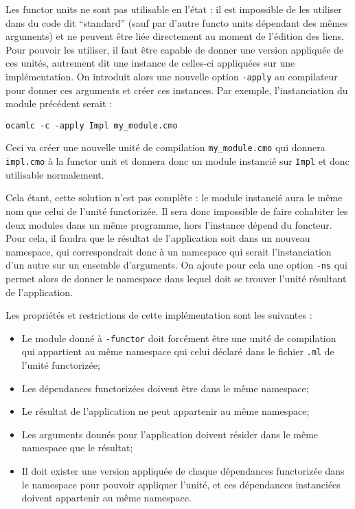 \documentclass[11pt,a4paper]{report}
\begin{document}
Les functor units ne sont pas utilisable en l'état : il est impossible de les
utiliser dans du code dit ``standard'' (sauf par d'autre functo units dépendant
des mêmes arguments) et ne peuvent être liée directement au
moment de l'édition des liens. Pour pouvoir les utiliser, il faut être capable
de donner une version appliquée de ces unités, autrement dit une instance de
celles-ci appliquées sur une implémentation. On introduit alors une nouvelle
option \texttt{-apply} au compilateur pour donner ces arguments et créer ces
instances. Par exemple, l'instanciation du module précédent serait :
\begin{verbatim}
ocamlc -c -apply Impl my_module.cmo
\end{verbatim}
Ceci va créer une nouvelle unité de compilation \texttt{my\_module.cmo} qui
donnera \texttt{impl.cmo} à la functor unit et donnera donc un module instancié
sur \texttt{Impl} et donc utilisable normalement. 

Cela étant, cette solution n'est pas complète : le module instancié aura le même
nom que celui de l'unité functorizée. Il sera donc impossible de faire cohabiter
les deux modules dans un même programme, hors l'instance dépend du
foncteur. Pour cela, il faudra que le résultat de l'application soit dans un
nouveau namespace, qui correspondrait donc à un namespace qui serait
l'instanciation d'un autre sur un ensemble d'arguments. On ajoute pour cela une
option \texttt{-ns} qui permet alors de donner le namespace dans lequel doit se
trouver l'unité résultant de l'application.

Les propriétés et restrictions de cette implémentation sont les suivantes :
\begin{itemize}
\item Le module donné à \texttt{-functor} doit forcément être une unité de
  compilation qui appartient au même namespace qui celui déclaré dans le fichier
  \texttt{.ml} de l'unité functorizée;
\item Les dépendances functorizées doivent être dans le même namespace;
\item Le résultat de l'application ne peut appartenir au même namespace;
\item Les arguments donnés pour l'application doivent résider dans le même
  namespace que le résultat;
\item Il doit exister une version appliquée de chaque dépendances functorizée
  dans le namespace pour pouvoir appliquer l'unité, et ces dépendances
  instanciées doivent appartenir au même namespace.
\end{itemize}
\end{document}
